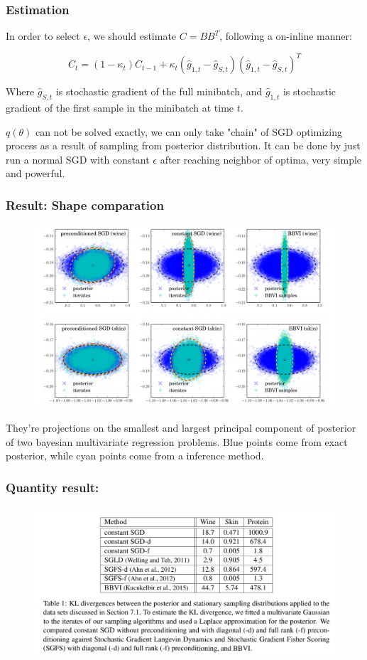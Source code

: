 \documentclass{beamer}
\begin{document}
\begin{frame}
    \frametitle{Estimation}

    In order to select $\epsilon$, we should estimate $C = BB^T$, following a on-inline manner:

    $$
    C_t = (1-\kappa_t)C_{t-1} + \kappa_t (\hat{g}_{1,t} - \hat{g}_{S,t})(\hat{g}_{1,t} - \hat{g}_{S,t})^T
    $$

    Where $\hat{g}_{S,t}$ is stochastic gradient of the full minibatch, and $\hat{g}_{1,t}$ is 
    stochastic gradient of the first sample in the minibatch at time $t$.

    $q(\theta)$ can not be solved exactly, we can only take "chain" of SGD optimizing process as a result of sampling from posterior distribution.
    It can be done by just run a normal SGD with constant $\epsilon$ after reaching neighbor of optima, 
    very simple and powerful.

\end{frame}

\begin{frame}
    \frametitle{Result: Shape comparation}

    \begin{figure}[htb]
        \centering
        \includegraphics[width=0.75\linewidth]{sgd_inference.png}
    \end{figure} 

    They're projections on the smallest and largest principal component of posterior 
    of two bayesian multivariate regression problems. Blue points come from exact posterior,
    while cyan points come from a inference method.
    
\end{frame}

\begin{frame}
    \frametitle{Quantity result:}

    \begin{figure}[htb]
        \centering
        \includegraphics[width=0.75\linewidth]{qc.png}
    \end{figure} 

\end{frame}
\end{document}
